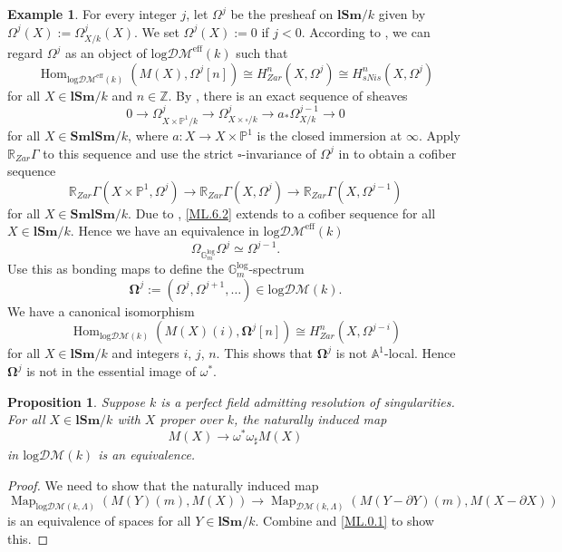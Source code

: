 \documentclass[11pt, a4paper]{amsart}
\newtheorem{prop}[thm]{Proposition}
\theoremstyle{definition}
\newtheorem{exm}[thm]{Example}
\numberwithin{equation}{subsection}
\newcommand{\R}{\mathbb{R}}
\renewcommand{\P}{\mathbb{P}}
\newcommand{\A}{\mathbb{A}}
\newcommand{\lSm}{\mathbf{lSm}}
\newcommand{\SmlSm}{\mathbf{SmlSm}}
\renewcommand{\hom}{\operatorname{Hom}}				 %
\newcommand{\bOmega}{\mathbf{\Omega}}
\newcommand{\boxx}{\square}
\newcommand{\Gmm}{\mathbb{G}_m^{\mathrm{log}}}
\newcommand{\Map}{\operatorname{Map}}
\newcommand{\inflogDM}{\mathrm{log}\mathcal{DM}}
\newcommand{\inflogDMeff}{\mathrm{log}\mathcal{DM}^{\mathrm{eff}}}
\newcommand{\infDM}{\mathcal{DM}}
\begin{document}
\begin{exm}
\label{ML.6}
For every integer $j$, let $\Omega^j$ be the presheaf on $\lSm/k$ given by $\Omega^j(X):=\Omega_{X/k}^j(X)$.
We set $\Omega^j(X):=0$ if $j<0$.
According to \cite[Theorem 9.7.1]{logDM}, we can regard $\Omega^j$ as an object of $\inflogDMeff(k)$ such that
\[
\hom_{\inflogDMeff(k)}(M(X),\Omega^j[n])
\cong
H_{Zar}^n(X,\Omega^j)
\cong
H_{sNis}^n(X,\Omega^j)
\]
for all $X\in \lSm/k$ and $n\in\mathbb{Z}$.
By \cite[Properties 2.3(b)]{EVbuch}, there is an exact sequence of sheaves
\[
0
\to
\Omega_{X\times \P^1/k}^j
\to
\Omega_{X\times \boxx/k}^j
\to
a_*\Omega_{X/k}^{j-1}
\to
0
\]
for all $X\in \SmlSm/k$, where $a\colon X\to X\times \P^1$ is the closed immersion at $\infty$.
Apply $\R_{Zar}\Gamma$ to this sequence and use the strict $\boxx$-invariance of $\Omega^j$ in 
\cite[Corollary 9.2.2]{logDM} to obtain a cofiber sequence
\begin{equation}
\label{ML.6.2}
\R_{Zar}\Gamma(X\times \P^1,\Omega^j)
\to
\R_{Zar}\Gamma(X,\Omega^j)
\to
\R_{Zar}\Gamma(X,\Omega^{j-1})
\end{equation}
for all $X\in \SmlSm/k$.
Due to \cite[Corollary 9.2.5, Proposition A.10.2]{logDM}, 
\eqref{ML.6.2} extends to a cofiber sequence for all $X\in \lSm/k$.
Hence we have an equivalence in $\inflogDMeff(k)$
\begin{equation}
\Omega_{\Gmm}\Omega^j
\simeq
\Omega^{j-1}.
\end{equation}
Use this as bonding maps to define the $\Gmm$-spectrum
\begin{equation}
\bOmega^j
:=
(\Omega^j,\Omega^{j+1},\ldots)\in \inflogDM(k).
\end{equation}
We have a canonical isomorphism
\begin{equation}
\hom_{\inflogDM(k)}(M(X)(i),\bOmega^j[n])
\cong
H_{Zar}^n(X,\Omega^{j-i})
\end{equation}
for all $X\in \lSm/k$ and integers $i$, $j$, $n$.
This shows that $\bOmega^j$ is not $\A^1$-local.
Hence $\bOmega^j$ is not in the essential image of $\omega^*$.
\end{exm}


\begin{prop}
\label{ML.1}
Suppose $k$ is a perfect field admitting resolution of singularities.
For all $X\in \lSm/k$ with $X$ proper over $k$, the naturally induced map
\[
M(X)\to \omega^*\omega_\sharp M(X)
\]
in $\inflogDM(k)$ is an equivalence.
\end{prop}
\begin{proof}
We need to show that the naturally induced map
\begin{equation}
\Map_{\inflogDM(k,\Lambda)}(M(Y)(m),M(X))
\to
\Map_{\infDM(k,\Lambda)}(M(Y-\partial Y)(m),M(X-\partial X))
\end{equation}
is an equivalence of spaces for all $Y\in \lSm/k$.
Combine \cite[Theorem 8.2.11]{logDM} and \eqref{ML.0.1} to show this.
\end{proof}
\end{document}
